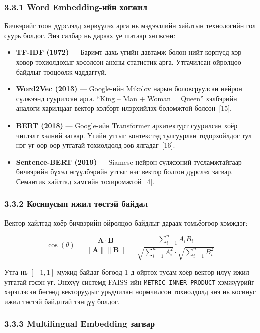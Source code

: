 \documentclass[11pt,a4paper]{article}
\begin{document}
\subsubsection*{3.3.1 Word Embedding-ийн хөгжил}\label{sec:tfidf-explained}

Бичвэрийг тоон дүрслэлд хөрвүүлэх арга нь мэдээллийн хайлтын технологийн гол суурь болдог. Энэ салбар нь дараах үе шатаар хөгжсөн:

\begin{itemize}
    \item \textbf{TF-IDF (1972)} --- Баримт дахь үгийн давтамж болон нийт корпусд хэр ховор тохиолдохыг хосолсон анхны статистик арга. Утгачилсан ойролцоо байдлыг тооцоолж чаддаггүй.
    \item \textbf{Word2Vec (2013)} --- Google-ийн Mikolov нарын боловсруулсан нейрон сүлжээнд суурилсан арга. ``King -- Man + Woman = Queen'' хэлбэрийн аналоги харилцааг вектор хэлбэрт илэрхийлэх боломжтой болсон~[15].
    \item \textbf{BERT (2018)} --- Google-ийн Transformer архитектурт суурилсан хоёр чиглэлт хэлний загвар. Үгийн утгыг контекстэд тулгуурлан тодорхойлдог тул нэг үг өөр өөр утгатай тохиолдолд зөв ялгадаг~[16].
    \item \textbf{Sentence-BERT (2019)} --- Siamese нейрон сүлжээний тусламжтайгаар бичвэрийн бүхэл өгүүлбэрийн утгыг нэг вектор болгон дүрслэх загвар. Семантик хайлтад хамгийн тохиромжтой~[4].
\end{itemize}

\subsubsection*{3.3.2 Косинусын ижил төстэй байдал}

Вектор хайлтад хоёр бичвэрийн ойролцоо байдлыг дараах томьёогоор хэмждэг:

\[
  \cos(\theta) = \frac{\mathbf{A} \cdot \mathbf{B}}{\|\mathbf{A}\| \|\mathbf{B}\|}
  = \frac{\sum_{i=1}^{n} A_i B_i}{\sqrt{\sum_{i=1}^{n} A_i^2} \cdot \sqrt{\sum_{i=1}^{n} B_i^2}}
\]

Утга нь $[-1, 1]$ мужид байдаг бөгөөд 1-д ойртох тусам хоёр вектор илүү ижил утгатай гэсэн үг. Энэхүү системд FAISS-ийн \texttt{METRIC\_INNER\_PRODUCT} хэмжүүрийг хэрэглэсэн бөгөөд векторуудыг урьдчилан нормчилсон тохиолдолд энэ нь косинус ижил төстэй байдлтай тэнцүү болдог.

\subsubsection*{3.3.3 Multilingual Embedding загвар}
\end{document}
